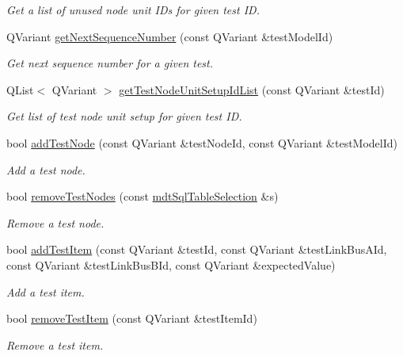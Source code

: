 \begin{DoxyCompactItemize}
\begin{DoxyCompactList}\small\item\em Get a list of unused node unit I\-Ds for given test I\-D. \end{DoxyCompactList}\item 
Q\-Variant \hyperlink{classmdt_tt_test_model_aa1db929c8f78953623a75b44ac596feb}{get\-Next\-Sequence\-Number} (const Q\-Variant \&test\-Model\-Id)
\begin{DoxyCompactList}\small\item\em Get next sequence number for a given test. \end{DoxyCompactList}\item 
Q\-List$<$ Q\-Variant $>$ \hyperlink{classmdt_tt_test_model_a75240a9cda2c24977e5b8a287ece10c8}{get\-Test\-Node\-Unit\-Setup\-Id\-List} (const Q\-Variant \&test\-Id)
\begin{DoxyCompactList}\small\item\em Get list of test node unit setup for given test I\-D. \end{DoxyCompactList}\item 
bool \hyperlink{classmdt_tt_test_model_a5dcbe2d3985231c373633f3b87e26f98}{add\-Test\-Node} (const Q\-Variant \&test\-Node\-Id, const Q\-Variant \&test\-Model\-Id)
\begin{DoxyCompactList}\small\item\em Add a test node. \end{DoxyCompactList}\item 
bool \hyperlink{classmdt_tt_test_model_a039e7d3cc5a07bf6bdf0e76d4d6465bb}{remove\-Test\-Nodes} (const \hyperlink{classmdt_sql_table_selection}{mdt\-Sql\-Table\-Selection} \&s)
\begin{DoxyCompactList}\small\item\em Remove a test node. \end{DoxyCompactList}\item 
bool \hyperlink{classmdt_tt_test_model_ac54d391512daafe1f60a7d124d03196b}{add\-Test\-Item} (const Q\-Variant \&test\-Id, const Q\-Variant \&test\-Link\-Bus\-A\-Id, const Q\-Variant \&test\-Link\-Bus\-B\-Id, const Q\-Variant \&expected\-Value)
\begin{DoxyCompactList}\small\item\em Add a test item. \end{DoxyCompactList}\item 
bool \hyperlink{classmdt_tt_test_model_a1c35a7ede5b6f099f2ff04c25267c63c}{remove\-Test\-Item} (const Q\-Variant \&test\-Item\-Id)
\begin{DoxyCompactList}\small\item\em Remove a test item. \end{DoxyCompactList}\item 

\end{DoxyCompactItemize}
